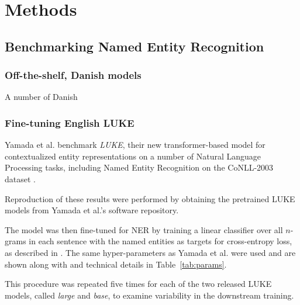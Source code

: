 \documentclass[main.tex]{subfiles}
\begin{document}
\chapter{Methods}

\section{Benchmarking Named Entity Recognition}
\subsection{Off-the-shelf, Danish models}
\label{sec:exidan}
A number of Danish 

\subsection{Fine-tuning English LUKE}
Yamada et al. benchmark \emph{LUKE}, their new transformer-based model for contextualized entity representations on a number of Natural Language Processing tasks, including Named Entity Recognition on the CoNLL-2003 dataset \cite{yamada2020luke}.

Reproduction of these results were performed by obtaining the pretrained LUKE models from Yamada et al.'s software repository.

The model was then fine-tuned for NER by training a linear classifier over all $n$-grams in each sentence with the named entities as targets for cross-entropy loss, as described in \cite[Sec. 4.3]{yamada2020luke}.
The same hyper-parameters as Yamada et al. were used and are shown along with and technical details in Table~\ref{tab:params}.

This procedure was repeated five times for each of the two released LUKE models, called \emph{large} and \emph{base}, to examine variability in the downstream training.
\end{document}
